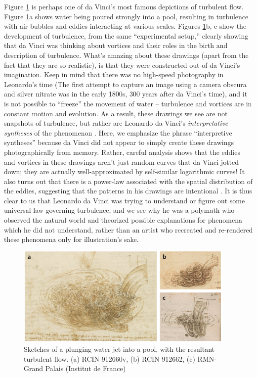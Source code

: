 \documentclass[12pt]{article}
\begin{document}
Figure \ref{fig:6} is perhaps one of da Vinci's most famous depictions of turbulent flow. Figure \ref{fig:6}a shows water being poured strongly into a pool, resulting in turbulence with air bubbles and eddies interacting at various scales. Figures \ref{fig:6}b, c show the development of turbulence, from the same ``experimental setup,'' clearly showing that da Vinci was thinking about {vortices} and their roles in the birth and description of turbulence. What's amazing about these drawings (apart from the fact that they are so realistic), is that they were constructed out of da Vinci's imagination. Keep in mind that there was no high-speed photography in Leonardo's time (The first attempt to capture an image using a camera obscura and silver nitrate was in the early 1800s, 300 years after da Vinci's time), and it is not possible to ``freeze'' the movement of water -- turbulence and vortices are in constant motion and evolution. As a result, these drawings we see are not snapshots of turbulence, but rather are Leonardo da Vinci's \textit{interpretative syntheses} of the phenomenon \cite{marusic2021leonardo}. Here, we emphasize the phrase ``interpretive syntheses'' because da Vinci did not appear to simply create these drawings photographically from memory. Rather, careful analysis shows that the eddies and vortices in these drawings aren't just random curves that da Vinci jotted down; they are actually well-approximated by self-similar logarithmic curves! It also turns out that there is a power-law associated with the spatial distribution of the eddies, suggesting that the patterns in his drawings are intentional \cite{marusic2021leonardo}. It is thus clear to us that Leonardo da Vinci was trying to understand or figure out some universal law governing turbulence, and we see why he was a polymath who observed the natural world and theorized possible explanations for phenomena which he did not understand, rather than an artist who recreated and re-rendered these phenomena only for illustration's sake.\\



\begin{figure}[!htb]
	\centering
	\includegraphics[width=0.95\textwidth]{LdV_6}
	\caption{Sketches of a plunging water jet into a pool, with the resultant turbulent flow. (a) RCIN 912660v, (b) RCIN 912662, (c) RMN-Grand Palais (Institut de France)}
	\label{fig:6}
\end{figure}
\end{document}
